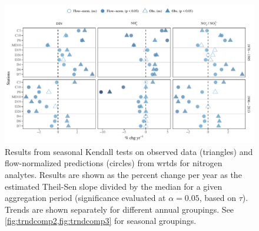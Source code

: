 \documentclass[journal = esthag, manuscript = article]{achemso}\usepackage[]{graphicx}\usepackage[]{color}
\begin{document}
\begin{figure}
\centering
\includegraphics[width=1\textwidth,page=1]{figs/trndcomp1.pdf}
\caption{Results from seasonal Kendall tests on observed data (triangles) and flow-normalized predictions (circles) from \ac{wrtds} for nitrogen analytes. Results are shown as the percent change per year as the estimated Theil-Sen slope divided by the median for a given aggregation period (significance evaluated at $\alpha = 0.05$, based on $\tau$). Trends are shown separately for different annual groupings. See \cref{fig:trndcomp2,fig:trndcomp3} for seasonal groupings.}
\label{fig:trndcomp1}   
\end{figure}
\end{document}

